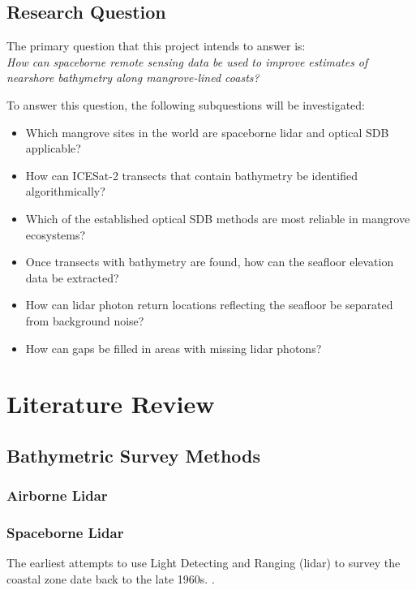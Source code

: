 \section{Research Question}
The primary question that this project intends to answer is: \\

\vspace{2mm}
\emph{How can spaceborne remote sensing data be used to improve estimates of nearshore bathymetry along mangrove-lined coasts?}

To answer this question, the following subquestions will be investigated:

\begin{itemize}
      \item Which mangrove sites in the world are spaceborne lidar and optical SDB applicable?
      \item How can ICESat-2 transects that contain bathymetry be identified algorithmically?
      \item Which of the established optical SDB methods are most reliable in mangrove ecosystems?
      \item Once transects with bathymetry are found, how can the seafloor elevation data be extracted?
      \item How can lidar photon return locations reflecting the seafloor be separated from background noise?
      \item How can gaps be filled in areas with missing lidar photons?
\end{itemize}

\chapter{Literature Review}


\section{Bathymetric Survey Methods}

\subsection[]{Airborne Lidar}
\subsection{Spaceborne Lidar}

The earliest attempts to use Light Detecting and Ranging (lidar) to survey the coastal zone date back to the late 1960s. \parencite{Bailly2016}.

